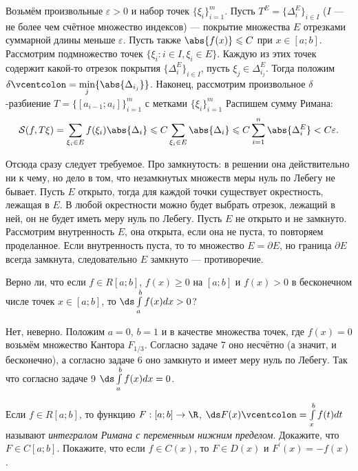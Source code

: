 \begin{solution}
    Возьмём произвольные $\varepsilon > 0$ и набор точек $\{\xi_i\}_{i = 1}^m$. Пусть $T^E = \{\Delta^E_i\}_{i \in I}$ ($I$ --- не более чем счётное множество индексов) --- покрытие множества $E$ отрезками суммарной длины меньше $\varepsilon$. Пусть также $\abs{f(x)} \leqslant C$ при $x \in [a; b]$. Рассмотрим подмножество точек $\{\xi_i : i \in I, \xi_i \in E\}$. Каждую из этих точек содержит какой-то отрезок покрытия $\{\Delta^E_i\}_{i \in I}$, пусть $\xi_j \in \Delta^E_{i_j}$. Тогда положим $\delta \vcentcolon = \min\limits_j\{\abs{\Delta_{i_j}}\}$. Наконец, рассмотрим произвольное $\delta$-разбиение $T = \{[a_{i - 1}; a_i]\}_{i = 1}^m$ с метками $\{\xi_i\}_{i = 1}^m$ Распишем сумму Римана:
    \[
        \mathcal{S}(f, T\xi) = \sum_{\xi_i \in E}f(\xi_i)\abs{\Delta_i} \leqslant C\sum_{\xi_i \in E}\abs{\Delta_i} \leqslant C \sum_{i = 1}^n\abs{\Delta^E_{i}} < C\varepsilon.
    \]

    Отсюда сразу следует требуемое. Про замкнутость: в решении она действительно ни к чему, но дело в том, что незамкнутых множеств меры нуль по Лебегу не бывает. Пусть $E$ открыто, тогда для каждой точки существует окрестность, лежащая в $E$. В любой окрестности можно будет выбрать отрезок, лежащий в ней, он не будет иметь меру нуль по Лебегу. Пусть $E$ не открыто и не замкнуто. Рассмотрим внутренность $E$, она открыта, если она не пуста, то повторяем проделанное. Если внутренность пуста, то то множество $E = \partial E$, но граница $\partial E$ всегда замкнута, следовательно $E$ замкнуто --- противоречие.
\end{solution}

\begin{problem}[10]
    Верно ли, что если $f \in R[a; b]$, $f(x) \geqslant 0$ на $[a; b]$ и $f(x) > 0$ в бесконечном числе точек $x \in [a; b]$, то $\ds\int\limits_a^bf(x)dx > 0$?
\end{problem}

\begin{solution}
    Нет, неверно. Положим $a = 0$, $b = 1$ и в качестве множества точек, где $f(x) = 0$ возьмём множество Кантора $F_{1 / 3}$. Согласно задаче 7 оно несчётно (а значит, и бесконечно), а согласно задаче 6 оно замкнуто и имеет меру нуль по Лебегу. Так что согласно задаче 9 $\ds\int\limits_a^bf(x)dx = 0$.
\end{solution}

\begin{problem}[11$^\circ$]
    Если $f \in R[a; b]$, то функцию $F: [a; b] \to \R$, $\ds F(x) \vcentcolon = \int\limits_x^bf(t)dt$ называют \textit{интегралом Римана с переменным нижним пределом}. Докажите, что $F \in C[a; b]$. Покажите, что если $f \in C(x)$, то $F \in D(x)$ и $F^\prime(x) = -f(x)$.
\end{problem}

